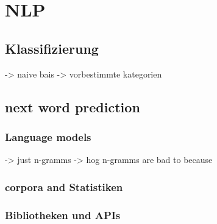 \section{NLP}

	\subsection{Klassifizierung}
    	-> naive bais
        -> vorbestimmte kategorien
        
	\subsection{next word prediction}
		\subsubsection{Language models}
        	-> just n-gramms
            -> hog n-gramms are bad to because \parencite[470]{cumpatationalLinguistics:classBasedNGramms}
		\subsubsection{corpora and Statistiken}
		\subsubsection{Bibliotheken und APIs}